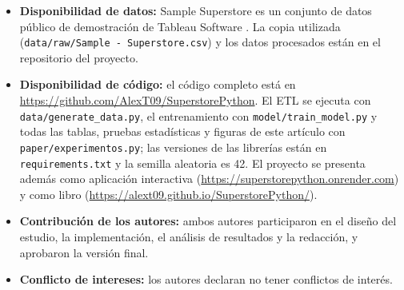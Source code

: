 \documentclass[pdflatex,sn-mathphys-num]{sn-jnl}
\begin{document}
\begin{itemize}
\item \textbf{Disponibilidad de datos:} Sample Superstore es un conjunto de datos público de demostración de Tableau Software \cite{superstore}. La copia utilizada (\texttt{data/raw/Sample - Superstore.csv}) y los datos procesados están en el repositorio del proyecto.
\item \textbf{Disponibilidad de código:} el código completo está en \url{https://github.com/AlexT09/SuperstorePython}. El ETL se ejecuta con \texttt{data/generate\_data.py}, el entrenamiento con \texttt{model/train\_model.py} y todas las tablas, pruebas estadísticas y figuras de este artículo con \texttt{paper/experimentos.py}; las versiones de las librerías están en \texttt{requirements.txt} y la semilla aleatoria es 42. El proyecto se presenta además como aplicación interactiva (\url{https://superstorepython.onrender.com}) y como libro (\url{https://alext09.github.io/SuperstorePython/}).
\item \textbf{Contribución de los autores:} ambos autores participaron en el diseño del estudio, la implementación, el análisis de resultados y la redacción, y aprobaron la versión final.
\item \textbf{Conflicto de intereses:} los autores declaran no tener conflictos de interés.
\end{itemize}


\end{document}
